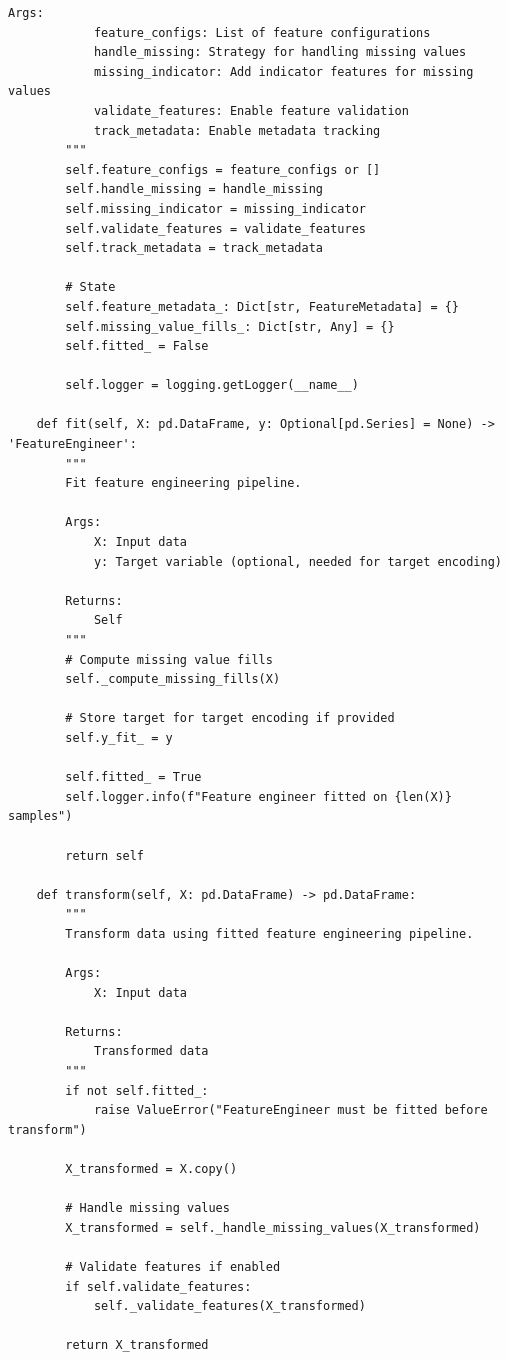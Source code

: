 \begin{lstlisting}[style=python, caption={Production Feature Engineering Framework}]
        Args:
            feature_configs: List of feature configurations
            handle_missing: Strategy for handling missing values
            missing_indicator: Add indicator features for missing values
            validate_features: Enable feature validation
            track_metadata: Enable metadata tracking
        """
        self.feature_configs = feature_configs or []
        self.handle_missing = handle_missing
        self.missing_indicator = missing_indicator
        self.validate_features = validate_features
        self.track_metadata = track_metadata

        # State
        self.feature_metadata_: Dict[str, FeatureMetadata] = {}
        self.missing_value_fills_: Dict[str, Any] = {}
        self.fitted_ = False

        self.logger = logging.getLogger(__name__)

    def fit(self, X: pd.DataFrame, y: Optional[pd.Series] = None) -> 'FeatureEngineer':
        """
        Fit feature engineering pipeline.

        Args:
            X: Input data
            y: Target variable (optional, needed for target encoding)

        Returns:
            Self
        """
        # Compute missing value fills
        self._compute_missing_fills(X)

        # Store target for target encoding if provided
        self.y_fit_ = y

        self.fitted_ = True
        self.logger.info(f"Feature engineer fitted on {len(X)} samples")

        return self

    def transform(self, X: pd.DataFrame) -> pd.DataFrame:
        """
        Transform data using fitted feature engineering pipeline.

        Args:
            X: Input data

        Returns:
            Transformed data
        """
        if not self.fitted_:
            raise ValueError("FeatureEngineer must be fitted before transform")

        X_transformed = X.copy()

        # Handle missing values
        X_transformed = self._handle_missing_values(X_transformed)

        # Validate features if enabled
        if self.validate_features:
            self._validate_features(X_transformed)

        return X_transformed


\end{lstlisting}
